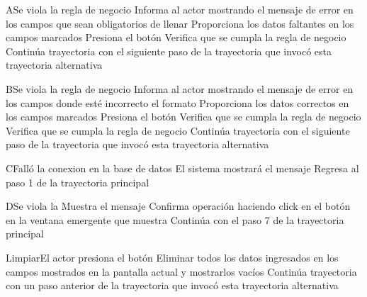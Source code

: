 
\begin{UCtrayectoriaA}{A}{Se viola la regla de negocio }	
			\UCpaso[\UCsist] Informa al actor mostrando el mensaje de error  en los campos que sean obligatorios de llenar
			\UCpaso[\UCactor] Proporciona los datos faltantes en los campos marcados 
			\UCpaso[\UCactor] Presiona el botón  
			\UCpaso[\UCactor] Verifica que se cumpla la regla de negocio  
			\UCpaso[\UCsist] Continúa trayectoria con el siguiente paso de la trayectoria que invocó esta trayectoria alternativa
\end{UCtrayectoriaA}


\begin{UCtrayectoriaA}{B}{Se viola la regla de negocio }	
			\UCpaso[\UCsist] Informa al actor mostrando el mensaje de error  en los campos donde esté incorrecto el formato
			\UCpaso[\UCactor] Proporciona los datos correctos en los campos marcados 
			\UCpaso[\UCactor] Presiona el botón   
			\UCpaso[\UCsist] Verifica que se cumpla la regla de negocio  
		\UCpaso[\UCsist] Verifica que se cumpla la regla de negocio  
			\UCpaso[\UCsist] Continúa trayectoria con el siguiente paso de la trayectoria que invocó esta trayectoria alternativa
\end{UCtrayectoriaA}


\begin{UCtrayectoriaA}{C}{Falló la conexion en la base de datos}
			\UCpaso[\UCsist] El sistema mostrará el mensaje 
			\UCpaso[\UCsist] Regresa al paso 1 de la trayectoria principal  
\end{UCtrayectoriaA}


\begin{UCtrayectoriaA}{D}{Se viola la }
			\UCpaso[\UCsist] Muestra el mensaje  
			\UCpaso[\UCactor] Confirma operación haciendo click en el botón  en la ventana emergente que muestra
			\UCpaso[\UCsist] Continúa con el paso 7 de la trayectoria principal  
\end{UCtrayectoriaA}


\begin{UCtrayectoriaA}{Limpiar}{El actor presiona el botón }
			\UCpaso[\UCsist] Eliminar todos los datos ingresados en los campos mostrados en la pantalla actual y mostrarlos vacíos
			\UCpaso[\UCsist] Continúa trayectoria con un paso anterior de la trayectoria que invocó esta trayectoria alternativa
\end{UCtrayectoriaA}